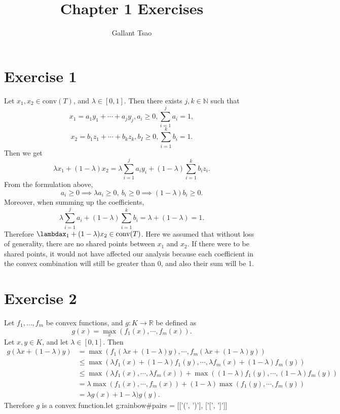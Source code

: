 \documentclass{article}
\title{Chapter 1 Exercises}
\author{Gallant Tsao}
\date{}
\begin{document}
\maketitle


\section*{Exercise 1}
Let $x_1, x_2 \in \text{conv}(T)$, and $\lambda \in [0, 1]$. Then there exists $j, k \in \mathbb{N}$ such that 
\[ x_1 = a_1 y_1 + \cdots + a_j y_j, a_i \geq 0, \sum_{i = 1}^{j} a_i = 1, \]
\[ x_2 = b_1 z_1 + \cdots + b_k z_k, b_I \geq 0, \sum_{i = 1}^{k} b_i = 1. \]
Then we get 
\[ \lambda x_1 + (1 - \lambda) x_2 
= \lambda \sum_{i = 1}^{j} a_i y_i + (1 - \lambda)\sum_{i = 1}^{k} b_i z_i. \]
From the formulation above, 
\[ a_i \geq 0 \implies \lambda a_i \geq 0, \ b_i \geq 0 \implies (1 - \lambda) b_i \geq 0. \]
Moreover, when summing up the coefficients, 
\[ \lambda \sum_{i = 1}^{j} a_i + (1 - \lambda) \sum_{i = 1}^{k} b_i = \lambda + (1 - \lambda) = 1. \]
Therefore $\lambdax_1 + (1 - \lambda)x_2 \in \text{conv}(T)$. Here we assumed that without loss of generality, there are no shared 
points between $x_1$ and $x_2$. If there were to be shared points, it would not have affected our analysis because each coefficient 
in the convex combination will still be greater than 0, and also their sum will be 1.


\newpage
\section*{Exercise 2}
Let $f_1, \dots, f_m$ be convex functions, and $g: K \to \mathbb{R}$ be defined as 
\[ g(x) = \max_{x}(f_1(x), \cdots, f_m(x)). \]
Let $x, y \in K$, and let $\lambda \in [0, 1]$. Then 
\begin{align*}
	g(\lambda x + (1 - \lambda)y) 
	&= \max_{}(f_1(\lambda x + (1 - \lambda)y), \cdots, f_m(\lambda x + (1 - \lambda)y)) \\
	&\leq \max_{}(\lambda f_1(x) + (1 - \lambda)f_1(y), \cdots, \lambda f_m(x) + (1 - \lambda) f_m(y)) \\
	&\leq \max_{}(\lambda f_1(x), \cdots, \lambda f_m(x)) + \max_{}((1 - \lambda)f_1(y), \cdots, (1 - \lambda)f_m(y)) \\
	&= \lambda \max_{}(f_1(x), \cdots, f_m(x)) + (1 - \lambda) \max_{}(f_1(y), \cdots, f_m(y)) \\
	&= \lambda g(x) + 1 - \lambda) g(y).
\end{align*}
Therefore $g$ is a convex function.let g:rainbow#pairs = [['(', ')'], ['[', ']']]
\end{document}
